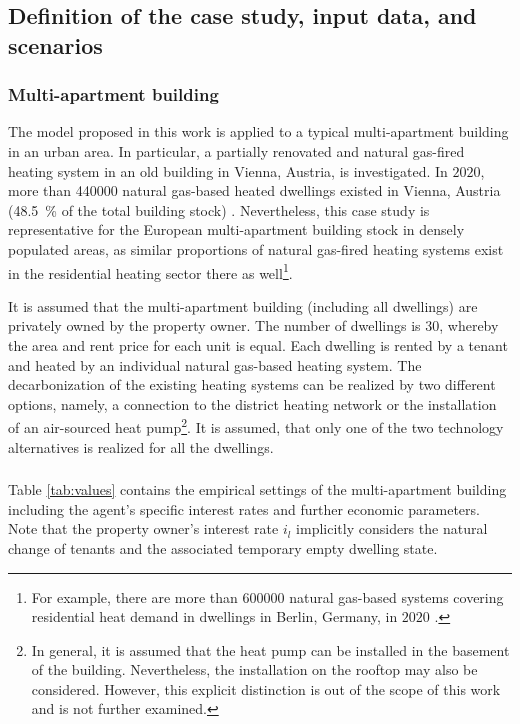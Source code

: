 \subsection{Definition of the case study, input data, and scenarios}\label{met:empirical}
\subsubsection{Multi-apartment building}
The model proposed in this work is applied to a typical multi-apartment building in an urban area. In particular, a partially renovated and natural gas-fired heating system in an old building in Vienna, Austria, is investigated. In $2020$, more than \SI{440000}{} natural gas-based heated dwellings existed in Vienna, Austria (\SI{48.5}{\%} of the total building stock) \cite{statistikaustriaheizen}. Nevertheless, this case study is representative for the European multi-apartment building stock in densely populated areas, as similar proportions of natural gas-fired heating systems exist in the residential heating sector there as well\footnote{For example, there are more than \SI{600000}{} natural gas-based systems covering residential heat demand in dwellings in Berlin, Germany, in $2020$ \cite{BDEW2019}.}.\vspace{0.5cm}

It is assumed that the multi-apartment building (including all dwellings) are privately owned by the property owner. The number of dwellings is $30$, whereby the area and rent price for each unit is equal. Each dwelling is rented by a tenant and heated by an individual natural gas-based heating system. The decarbonization of the existing heating systems can be realized by two different options, namely, a connection to the district heating network or the installation of an air-sourced heat pump\footnote{In general, it is assumed that the heat pump can be installed in the basement of the building. Nevertheless, the installation on the rooftop may also be considered. However, this explicit distinction is out of the scope of this work and is not further examined.}. It is assumed, that only one of the two technology alternatives is realized for all the dwellings.

\subsubsection{}\label{sec:data}
Table \ref{tab:values} contains the empirical settings of the multi-apartment building including the agent's specific interest rates and further economic parameters. Note that the property owner's interest rate $i_l$ implicitly considers the natural change of tenants and the associated temporary empty dwelling state. 
	
